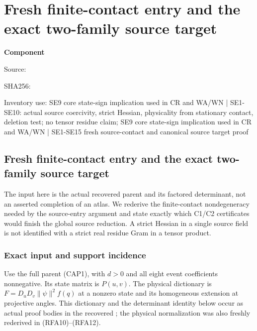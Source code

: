 \chapter{Fresh finite-contact entry and the exact two-family source target}
\label{component:p477c0ac30750}
\noindent\textbf{Component }\par
{\small\noindent Source: \par}
{\small\noindent SHA256: \par}
{\small\noindent Inventory use: SE9 core state-sign implication used in CR and WA/WN | SE1-SE10: actual source coercivity, strict Hessian, physicality from stationary contact, deletion test; no tensor residue claim; SE9 core state-sign implication used in CR and WA/WN | SE1-SE15 fresh source-contact and canonical source target proof\par}
\medskip
\section{Fresh finite-contact entry and the exact two-family source target}
\label{p477c0ac30750:sec:rederived-contact-entry}

The input here is the actual recovered parent and its factored determinant,
not an asserted completion of an atlas.  We rederive the finite-contact
nondegeneracy needed by the source-entry argument and state exactly which
C1/C2 certificates would finish the global source reduction.  A strict
Hessian in a single source field is not identified with a strict real
residue Gram in a tensor product.

\subsection{Exact input and support incidence}

Use the full parent (CAP1), with $d>0$ and all eight event coefficients
nonnegative.  Its state matrix is $P(u,v)$.  The physical dictionary is
$F=D_uD_v\|\psi\|^2 f(q)$ at a nonzero state and its homogeneous
extension at projective angles.  This dictionary and the determinant
identity below occur as actual proof bodies in the recovered
; the physical normalization was also freshly
rederived in (RFA10)--(RFA12).

